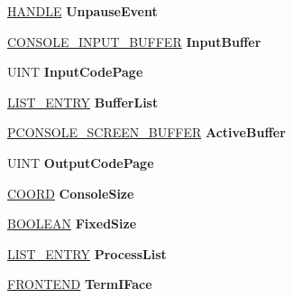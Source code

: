 \begin{DoxyCompactItemize}
\hyperlink{interfacevoid}{H\+A\+N\+D\+LE} {\bfseries Unpause\+Event}
\item 
\mbox{\label{struct___c_o_n_s_o_l_e_a9a1e90b72ba8ff9557c245ac07efb18b}} 
\hyperlink{struct___c_o_n_s_o_l_e___i_n_p_u_t___b_u_f_f_e_r}{C\+O\+N\+S\+O\+L\+E\+\_\+\+I\+N\+P\+U\+T\+\_\+\+B\+U\+F\+F\+ER} {\bfseries Input\+Buffer}
\item 
\mbox{\label{struct___c_o_n_s_o_l_e_a912cc30a0b5f440dd3cb6a8afeb47693}} 
U\+I\+NT {\bfseries Input\+Code\+Page}
\item 
\mbox{\label{struct___c_o_n_s_o_l_e_a2c26d00be73d7a67bded47c4fdb5a3b8}} 
\hyperlink{struct___l_i_s_t___e_n_t_r_y}{L\+I\+S\+T\+\_\+\+E\+N\+T\+RY} {\bfseries Buffer\+List}
\item 
\mbox{\label{struct___c_o_n_s_o_l_e_aededa921cdcec7dbff921061e362300c}} 
\hyperlink{struct___c_o_n_s_o_l_e___s_c_r_e_e_n___b_u_f_f_e_r}{P\+C\+O\+N\+S\+O\+L\+E\+\_\+\+S\+C\+R\+E\+E\+N\+\_\+\+B\+U\+F\+F\+ER} {\bfseries Active\+Buffer}
\item 
\mbox{\label{struct___c_o_n_s_o_l_e_a2e0ab33fde9ddb1f795ea5796384d1a6}} 
U\+I\+NT {\bfseries Output\+Code\+Page}
\item 
\mbox{\label{struct___c_o_n_s_o_l_e_a76a5f305f271bd2511ea888d0c46ace8}} 
\hyperlink{struct___c_o_o_r_d}{C\+O\+O\+RD} {\bfseries Console\+Size}
\item 
\mbox{\label{struct___c_o_n_s_o_l_e_a1588c83ce5172e3af118370da45b1714}} 
\hyperlink{_processor_bind_8h_a112e3146cb38b6ee95e64d85842e380a}{B\+O\+O\+L\+E\+AN} {\bfseries Fixed\+Size}
\item 
\mbox{\label{struct___c_o_n_s_o_l_e_a9a2db9d24d94d4752d01e91599f070df}} 
\hyperlink{struct___l_i_s_t___e_n_t_r_y}{L\+I\+S\+T\+\_\+\+E\+N\+T\+RY} {\bfseries Process\+List}
\item 
\mbox{\label{struct___c_o_n_s_o_l_e_abe68e000303ae509439c1c4527927fa3}} 
\hyperlink{struct___f_r_o_n_t_e_n_d}{F\+R\+O\+N\+T\+E\+ND} {\bfseries Term\+I\+Face}

\end{DoxyCompactItemize}
